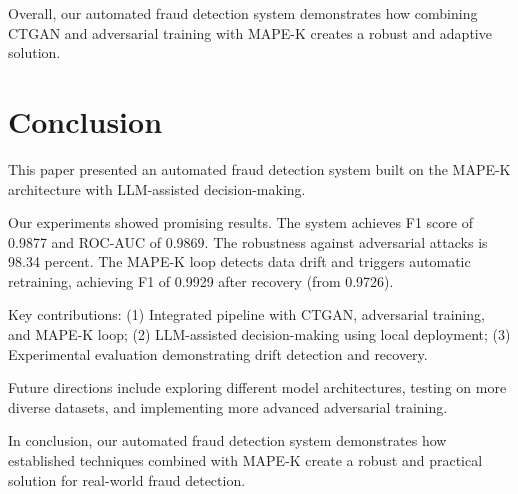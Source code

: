 \documentclass{svproc}
\begin{document}
Overall, our automated fraud detection system demonstrates how combining CTGAN and adversarial training with MAPE-K creates a robust and adaptive solution.

\section{Conclusion}\label{sec:conclusion}
This paper presented an automated fraud detection system built on the MAPE-K architecture with LLM-assisted decision-making.

Our experiments showed promising results. The system achieves F1 score of 0.9877 and ROC-AUC of 0.9869. The robustness against adversarial attacks is 98.34 percent. The MAPE-K loop detects data drift and triggers automatic retraining, achieving F1 of 0.9929 after recovery (from 0.9726).

Key contributions: (1) Integrated pipeline with CTGAN, adversarial training, and MAPE-K loop; (2) LLM-assisted decision-making using local deployment; (3) Experimental evaluation demonstrating drift detection and recovery.

Future directions include exploring different model architectures, testing on more diverse datasets, and implementing more advanced adversarial training.

In conclusion, our automated fraud detection system demonstrates how established techniques combined with MAPE-K create a robust and practical solution for real-world fraud detection.



\end{document}
